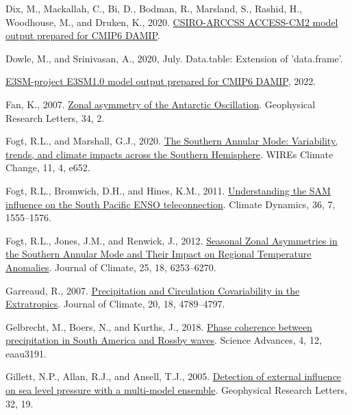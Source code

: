 \documentclass[12pt,oneside]{reedthesis}
\newlength{\cslhangindent}
\newenvironment{CSLReferences}[2] %
 {%
  \setlength{\parindent}{0pt}
  \ifodd #1 \everypar{\setlength{\hangindent}{\cslhangindent}}\ignorespaces\fi
  \ifnum #2 > 0
  \setlength{\parskip}{#2\baselineskip}
  \fi
 }%
 {}
\begin{document}
\begin{CSLReferences}{1}{0}
\leavevmode{}%
Dix, M., Mackallah, C., Bi, D., Bodman, R., Marsland, S., Rashid, H., Woodhouse, M., and Druken, K., 2020. \href{https://doi.org/10.22033/ESGF/CMIP6.14361}{CSIRO-ARCCSS ACCESS-CM2 model output prepared for CMIP6 DAMIP}.

\leavevmode{}%
Dowle, M., and Srinivasan, A., 2020, July. Data.table: {Extension} of 'data.frame'.

\leavevmode{}%
\href{http://cera-www.dkrz.de/WDCC/meta/CMIP6/CMIP6.DAMIP.E3SM-Project.E3SM-1-0}{E3SM-project E3SM1.0 model output prepared for CMIP6 DAMIP}, 2022.

\leavevmode{}%
Fan, K., 2007. \href{https://doi.org/10.1029/2006GL028045}{Zonal asymmetry of the {Antarctic Oscillation}}. Geophysical Research Letters, 34, 2.

\leavevmode{}%
Fogt, R.L., and Marshall, G.J., 2020. \href{https://doi.org/10.1002/wcc.652}{The {Southern Annular Mode}: {Variability}, trends, and climate impacts across the {Southern Hemisphere}}. WIREs Climate Change, 11, 4, e652.

\leavevmode{}%
Fogt, R.L., Bromwich, D.H., and Hines, K.M., 2011. \href{https://doi.org/10.1007/s00382-010-0905-0}{Understanding the {SAM} influence on the {South Pacific ENSO} teleconnection}. Climate Dynamics, 36, 7, 1555--1576.

\leavevmode{}%
Fogt, R.L., Jones, J.M., and Renwick, J., 2012. \href{https://doi.org/10.1175/JCLI-D-11-00474.1}{Seasonal {Zonal Asymmetries} in the {Southern Annular Mode} and {Their Impact} on {Regional Temperature Anomalies}}. Journal of Climate, 25, 18, 6253--6270.

\leavevmode{}%
Garreaud, R., 2007. \href{https://doi.org/10.1175/JCLI4257.1}{Precipitation and {Circulation Covariability} in the {Extratropics}}. Journal of Climate, 20, 18, 4789--4797.

\leavevmode{}%
Gelbrecht, M., Boers, N., and Kurths, J., 2018. \href{https://doi.org/10.1126/sciadv.aau3191}{Phase coherence between precipitation in {South America} and {Rossby} waves}. Science Advances, 4, 12, eaau3191.

\leavevmode{}%
Gillett, N.P., Allan, R.J., and Ansell, T.J., 2005. \href{https://doi.org/10.1029/2005GL023640}{Detection of external influence on sea level pressure with a multi-model ensemble}. Geophysical Research Letters, 32, 19.


\end{CSLReferences}
\end{document}

